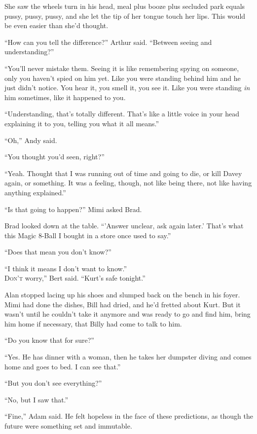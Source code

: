 \documentclass{article}
\begin{document}
She saw the wheels turn in his head, meal plus booze plus secluded
park equals pussy, pussy, pussy, and she let the tip of her tongue
touch her lips.  This would be even easier than she'd thought.

``How can you tell the difference?'' Arthur said.  ``Between seeing
and understanding?''

``You'll never mistake them.  Seeing it is like remembering spying on
someone, only you haven't spied on him yet.  Like you were standing
behind him and he just didn't notice.  You hear it, you smell it, you
see it.  Like you were standing \textit{in} him sometimes, like it
happened to you.

``Understanding, that's totally different.  That's like a little voice
in your head explaining it to you, telling you what it all means.''

``Oh,'' Andy said.

``You thought you'd seen, right?''

``Yeah.  Thought that I was running out of time and going to die, or
kill Davey again, or something.  It was a feeling, though, not like
being there, not like having anything explained.''

``Is that going to happen?'' Mimi asked Brad.

Brad looked down at the table.  ``'Answer unclear, ask again later.'
That's what this Magic 8-Ball I bought in a store once used to say.''

``Does that mean you don't know?''

``I think it means I don't want to know.''
\\
\lettrine[lines=3, lhang=.5, nindent=0pt, findent=2pt]{D}{on't}
worry,'' Bert said.  ``Kurt's safe tonight.''

Alan stopped lacing up his shoes and slumped back on the bench in his
foyer.  Mimi had done the dishes, Bill had dried, and he'd fretted
about Kurt.  But it wasn't until he couldn't take it anymore and was
ready to go and find him, bring him home if necessary, that Billy had
come to talk to him.

``Do you know that for sure?''

``Yes.  He has dinner with a woman, then he takes her dumpster diving
and comes home and goes to bed.  I can see that.''

``But you don't see everything?''

``No, but I saw that.''

``Fine,'' Adam said.  He felt hopeless in the face of these
predictions, as though the future were something set and immutable.
\end{document}

